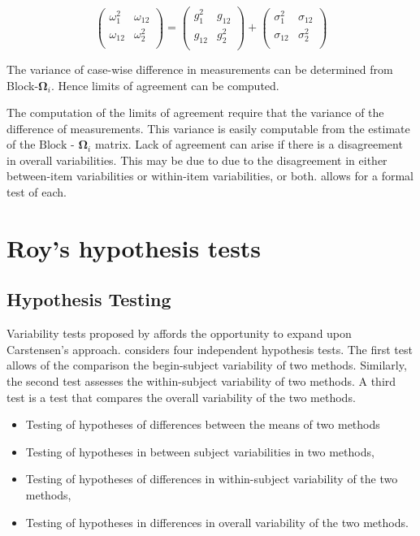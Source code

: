 \documentclass[12pt, a4paper]{report}
\theoremstyle{plain}
\theoremstyle{definition}
\theoremstyle{remark}
\begin{document}
\begin{center}
	\[\left(\begin{array}{cc}
	\omega^2_1  & \omega_{12} \\
	\omega_{12} & \omega^2_2 \\
	\end{array}  \right)
	=  \left(
	\begin{array}{cc}
	g^2_1  & g_{12} \\
	g_{12} & g^2_2 \\
	\end{array} \right)+
	\left(
	\begin{array}{cc}
	\sigma^2_1  & \sigma_{12} \\
	\sigma_{12} & \sigma^2_2 \\
	\end{array}\right)
	\]
\end{center}

The variance of case-wise difference in measurements can be determined from Block-$\boldsymbol{\Omega}_{i}$. Hence limits of agreement can be computed.


The computation of the limits of agreement require that the variance of the difference of measurements. This variance is easily computable from the estimate of the ${\mbox{Block - }\boldsymbol \Omega_{i}}$ matrix. Lack of agreement can arise if there is a disagreement in overall variabilities. This may be due to due to the disagreement in either between-item
variabilities or within-item variabilities, or both. \citet{ARoy2009} allows for a formal test of each.


\chapter{Roy's hypothesis tests}
\section{Hypothesis Testing}

	
	Variability tests proposed by \citet{ARoy2009} affords the opportunity to expand upon Carstensen's approach. \citet{ARoy2009} considers four independent hypothesis tests. The first test allows of the comparison the begin-subject variability of two methods. Similarly, the second test assesses the within-subject variability of two methods. A third test is a test that compares the overall variability of the two methods.
	\begin{itemize}
		\item Testing of hypotheses of differences between the means of
		two methods\item Testing of hypotheses in between subject
		variabilities in two methods, \item Testing of hypotheses of
		differences in within-subject variability of the two methods,
		\item Testing of hypotheses in differences in overall variability
		of the two methods.
	\end{itemize}
	
\end{document}
